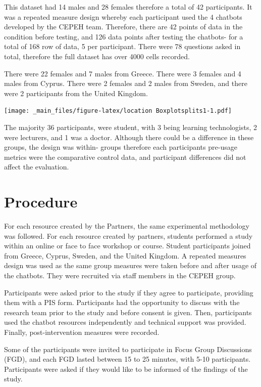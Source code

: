 \documentclass[a4paper, nobind]{templates/ociamthesis}
\begin{document}
This dataset had 14 males and 28 females therefore a total of 42 participants.
It was a repeated measure design whereby each participant used the 4 chatbots developed by the CEPEH team.
Therefore, there are 42 points of data in the condition before testing, and 126 data points after testing the chatbots- for a total of 168 row of data, 5 per participant.
There were 78 questions asked in total, therefore the full dataset has over 4000 cells recorded.

There were 22 females and 7 males from Greece.
There were 3 females and 4 males from Cyprus.
There were 2 females and 2 males from Sweden,
and there were 2 participants from the United Kingdom.

\texttt{[image: \_main\_files/figure-latex/location Boxplotsplits1-1.pdf]}

The majority 36 participants, were student, with 3 being learning technologists, 2 were lecturers, and 1 was a doctor.
Although there could be a difference in these groups, the design was within- groups therefore each participants pre-usage metrics were the comparative control data, and participant differences did not affect the evaluation.

\hypertarget{procedure}{%
\section{Procedure}\label{procedure}}

For each resource created by the Partners, the same experimental methodology was followed.
For each resource created by partners, students performed a study within an online or face to face workshop or course.
Student participants joined from Greece, Cyprus, Sweden, and the United Kingdom.
A repeated measures design was used as the same group measures were taken before and after usage of the chatbots.
They were recruited via staff members in the CEPEH group.

Participants were asked prior to the study if they agree to participate, providing them with a PIS form.
Participants had the opportunity to discuss with the research team prior to the study and before consent is given.
Then, participants used the chatbot resources independently and technical support was provided.
Finally, post-intervention measures were recorded.

Some of the participants were invited to participate in Focus Group Discussions (FGD), and each FGD lasted between 15 to 25 minutes, with 5-10 participants.
Participants were asked if they would like to be informed of the findings of the study.
\end{document}
